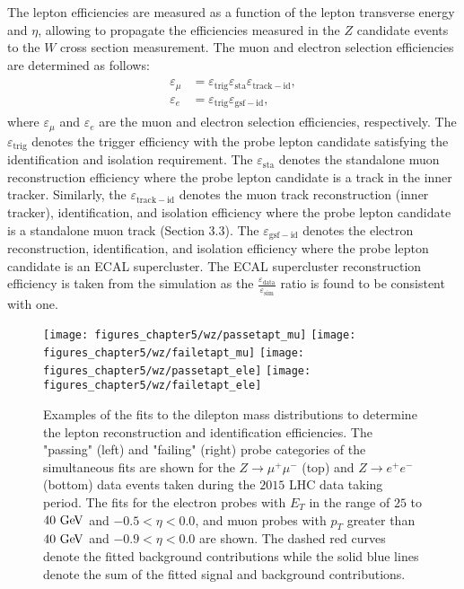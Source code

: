The lepton efficiencies are measured as a function of the lepton transverse energy and $\eta$, allowing to propagate the efficiencies measured in the $Z$ candidate events to the $W$ cross section measurement. The muon and electron selection efficiencies are determined as follows: 
\begin{eqnarray} \label{eq:eff2}
\begin{aligned}
\varepsilon_{\mu} &=  \varepsilon_{\mathrm{trig}}\varepsilon_{\mathrm{sta}}\varepsilon_{\mathrm{track-id}}, \\
\varepsilon_{e} &=  \varepsilon_{\mathrm{trig}}\varepsilon_{\mathrm{gsf-id}},
\end{aligned}
\end{eqnarray}
where $\varepsilon_{\mu}$ and $\varepsilon_{e}$ are the muon and electron selection efficiencies, respectively. The $\varepsilon_{\mathrm{trig}}$ denotes the trigger efficiency with the probe lepton candidate satisfying the identification and isolation requirement. The  $\varepsilon_{\mathrm{sta}}$ denotes the standalone muon reconstruction efficiency where the probe lepton candidate is a track in the inner tracker. Similarly, the $\varepsilon_{\mathrm{track-id}}$ denotes the muon track reconstruction (inner tracker),  identification, and isolation efficiency where the probe lepton candidate is a standalone muon track (Section 3.3). The $\varepsilon_{\mathrm{gsf-id}}$ denotes the electron reconstruction, identification, and isolation efficiency where the probe lepton candidate is an ECAL supercluster. The ECAL supercluster reconstruction efficiency is taken from the simulation as the $\frac{\varepsilon_{\mathrm{data}}}{\varepsilon_{\mathrm{sim}}}$ ratio is found to be consistent with one. 
\begin{figure}[htbp]
\centering
\texttt{[image: figures\_chapter5/wz/passetapt\_mu]}
\texttt{[image: figures\_chapter5/wz/failetapt\_mu]}
\texttt{[image: figures\_chapter5/wz/passetapt\_ele]}
\texttt{[image: figures\_chapter5/wz/failetapt\_ele]}
\caption{Examples of the fits to the dilepton mass distributions to determine the lepton reconstruction and identification efficiencies. The "passing" (left) and "failing" (right) probe categories of the simultaneous fits are shown for the $Z\rightarrow \mu^{+}\mu^{-}$ (top) and $Z\rightarrow e^{+}e^{-}$ (bottom) data events taken during the $2015$ LHC data taking period. The fits for the electron probes with $E_{T}$ in the range of $25$ to $40~\mathrm{Ge\kern -0.1em V}$ and $-0.5<\eta<0.0$, and muon probes with $p_{T}$ greater than $40~\mathrm{Ge\kern -0.1em V}$ and $-0.9<\eta<0.0$ are shown. The dashed red curves denote the fitted background contributions while the solid blue lines denote the sum of the fitted signal and background contributions.}
\label{fig:tgp}
\end{figure}

